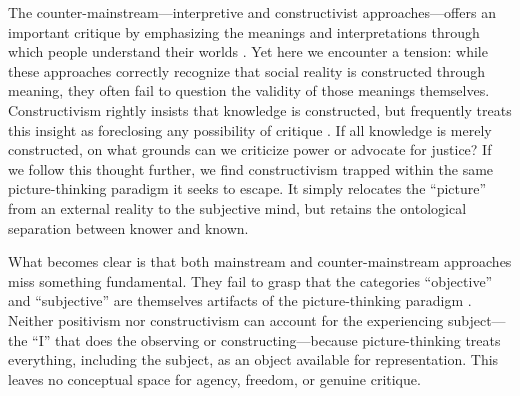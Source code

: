 \documentclass[12pt]{book}
\begin{document}
The counter-mainstream—interpretive and constructivist approaches—offers an important critique by emphasizing the meanings and interpretations through which people understand their worlds \parencite{Carspecken1995aa}. Yet here we encounter a tension: while these approaches correctly recognize that social reality is constructed through meaning, they often fail to question the validity of those meanings themselves. Constructivism rightly insists that knowledge is constructed, but frequently treats this insight as foreclosing any possibility of critique \parencite{Carspecken1995aa, Carspecken1999}. If all knowledge is merely constructed, on what grounds can we criticize power or advocate for justice? If we follow this thought further, we find constructivism trapped within the same picture-thinking paradigm it seeks to escape. It simply relocates the ``picture'' from an external reality to the subjective mind, but retains the ontological separation between knower and known.

What becomes clear is that both mainstream and counter-mainstream approaches miss something fundamental. They fail to grasp that the categories ``objective'' and ``subjective'' are themselves artifacts of the picture-thinking paradigm \parencite{carspecken_limits_2016}. Neither positivism nor constructivism can account for the experiencing subject—the ``I'' that does the observing or constructing—because picture-thinking treats everything, including the subject, as an object available for representation. This leaves no conceptual space for agency, freedom, or genuine critique.
\end{document}
